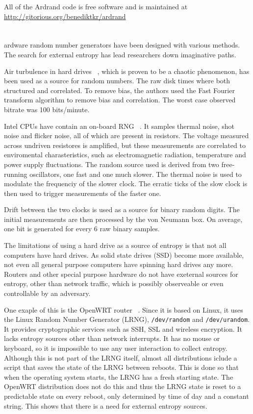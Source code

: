 \documentclass[a4paper]{article}           %
\newcommand{\tmpsection}[1]{}
\let\tmpsection=\section
\renewcommand{\section}[2]{

    \ifthenelse{
      \equal{#2}{Heimildir} %
    }
    {
      \tmpsection{\sc{#1} }
      \tmpsection{\sc{#2} }
    }
    {\tmpsection{\sc{#1} } }
      

}
\begin{document}
All of the Ardrand code is free software and is maintained at \url{http://gitorious.org/benediktkr/ardrand}

\section{Related Work -  Background}

Hardware random number generators have been designed with various methods. The search for external entropy has lead researchers down imaginative paths.

Air turbulence in hard drives ~\cite{airturb}, which is proven to be a chaotic phenomenon, has been used as a source for random numbers. The raw disk times where both structured and correlated. To remove bias, the authors used the Fast Fourier transform algorithm to remove bias and correlation. The worst case observed bitrate was 100 bits/minute. 

Intel CPUs have contain an on-board RNG ~\cite{intel}. It samples thermal noise, shot noise and flicker noise, all of which are present in resistors. The voltage measured across undriven resistores is amplified, but these measurements are correlated to enviromental charasteristics, such as electromagnetic radiation, temperature and power supply fluctuations. The random source used is derived from two free-running oscillators, one fast and one much slower. The thermal noise is used to modulate the frequenciy of the slower clock. The erratic ticks of the slow clock is then used to trigger measurements of the faster one.

Drift between the two clocks is used as a source for binary random digits. The initial measurements are then processed by the von Neumann box. On average, one bit is generated for every 6 raw binary samples. 

The limitations of using a hard drive as a source of entropy is that not all computers have hard drives. As solid state drives (SSD) become more available, not even all general purpose computers have spinning hard drives any more. Routers and other special purpose hardware do not have exeternal sources for entropy, other than network traffic, which is possibly observeable or even controllable by an adversary. 

One exaple of this is the OpenWRT router ~\cite{lrng}. Since it is based on Linux, it uses the Linux Random Number Generator (LRNG), \texttt{/dev/random} and \texttt{/dev/urandom}. It provides cryptographic services such as SSH, SSL and wireless encryption. It lacks entropy sources other than network interrupts. It has no mouse or keyboard, so it is impossible to use any user interaction to collect entropy. Although this is not part of the LRNG itself, almost all distributions iclude a script that saves the state of the LRNG between reboots. This is done so that when the operating system starts, the LRNG has a fresh starting state. The OpenWRT distribution does not do this and thus the LRNG state is reset to a predictable state on every reboot, only determined by time of day and a constant string. This shows that there is a need for external entropy sources. 
\end{document}
